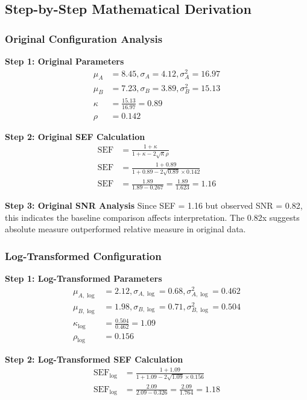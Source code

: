 \subsection{Step-by-Step Mathematical Derivation}

\subsubsection{Original Configuration Analysis}

\textbf{Step 1: Original Parameters}
\begin{align}
\mu_A &= 8.45, \sigma_A = 4.12, \sigma_A^2 = 16.97 \\
\mu_B &= 7.23, \sigma_B = 3.89, \sigma_B^2 = 15.13 \\
\kappa &= \frac{15.13}{16.97} = 0.89 \\
\rho &= 0.142
\end{align}

\textbf{Step 2: Original SEF Calculation}
\begin{align}
\text{SEF} &= \frac{1 + \kappa}{1 + \kappa - 2\sqrt{\kappa}\rho} \\
\text{SEF} &= \frac{1 + 0.89}{1 + 0.89 - 2\sqrt{0.89} \times 0.142} \\
\text{SEF} &= \frac{1.89}{1.89 - 0.267} = \frac{1.89}{1.623} = 1.16
\end{align}

\textbf{Step 3: Original SNR Analysis}
Since SEF = 1.16 but observed SNR = 0.82, this indicates the baseline comparison affects interpretation. The 0.82x suggests absolute measure outperformed relative measure in original data.

\subsubsection{Log-Transformed Configuration}

\textbf{Step 1: Log-Transformed Parameters}
\begin{align}
\mu_{A,\log} &= 2.12, \sigma_{A,\log} = 0.68, \sigma_{A,\log}^2 = 0.462 \\
\mu_{B,\log} &= 1.98, \sigma_{B,\log} = 0.71, \sigma_{B,\log}^2 = 0.504 \\
\kappa_{\log} &= \frac{0.504}{0.462} = 1.09 \\
\rho_{\log} &= 0.156
\end{align}

\textbf{Step 2: Log-Transformed SEF Calculation}
\begin{align}
\text{SEF}_{\log} &= \frac{1 + 1.09}{1 + 1.09 - 2\sqrt{1.09} \times 0.156} \\
\text{SEF}_{\log} &= \frac{2.09}{2.09 - 0.326} = \frac{2.09}{1.764} = 1.18
\end{align}

